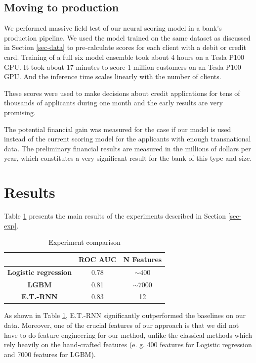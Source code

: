 \documentclass[sigconf]{acmart}
\begin{document}
\subsection{Moving to production}

We performed massive field test of our neural scoring model in a bank's production pipeline. We used the model trained on the same dataset as discussed in Section \ref{sec-data} to pre-calculate scores for each client with a debit or credit card. Training of a full six model ensemble took about 4 hours on a Tesla P100 GPU. It took about 17 minutes to score 1 million customers on an Tesla P100 GPU. And the inference time scales linearly with the number of clients.

These scores were used to make decisions about credit applications for tens of thousands of applicants during one month and the early results are very promising. 

The potential financial gain was measured for the case if our model is used instead of the current scoring model for the applicants with enough transnational data. The preliminary financial results are measured in the millions of dollars per year, which constitutes a very significant result for the bank of this type and size.

\section{Results}

Table \ref{tab-res} presents the main results of the experiments described in Section \ref{sec-exp}.

\begin{table}[ht]
\caption{Experiment comparison}
\begin{tabular}{ | c | c | c | }
\hline
& \textbf{ROC AUC} & \textbf{N Features} \\
\hline
\textbf{Logistic regression} & 0.78 & $\sim400$ \\
\textbf{LGBM} & 0.81 & $\sim7000$ \\
\textbf{E.T.-RNN} & 0.83 & 12 \\
\hline
\end{tabular}
\label{tab-res}
\end{table}

As shown in Table \ref{tab-res}, E.T.-RNN significantly outperformed the baselines on our data. Moreover, one of the crucial features of our approach is that we did not have to do feature engineering for our method, unlike the classical methods which rely heavily on the hand-crafted features (e. g. 400 features for Logistic regression and 7000 features for LGBM).
\end{document}
